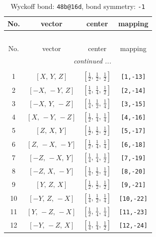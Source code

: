 \documentclass[fleqn,8pt]{jsarticle}
\begin{document}
\begin{longtable}{cccc}
\caption{Wyckoff bond: {\tt 48b@16d}, bond symmetry: {\tt -1}}
 \\
 \hline \hline
No. & vector & center & mapping \\ \hline \endfirsthead

\multicolumn{3}{l}{\tablename\ \thetable{}} \\
 \hline \hline
No. & vector & center & mapping \\ \hline \endhead

 \hline \hline
\multicolumn{3}{r}{\footnotesize\it continued ...} \\ \endfoot

 \hline \hline
\multicolumn{3}{r}{} \\ \endlastfoot

1 & $\left[ X,\, Y,\, Z \right]$ & $\left[ \frac{1}{2},\, \frac{1}{2},\, \frac{1}{2} \right]$ & {\tt [1,-13]} \\ \hline
2 & $\left[ - X,\, - Y,\, Z \right]$ & $\left[ \frac{1}{4},\, \frac{1}{4},\, \frac{1}{2} \right]$ & {\tt [2,-14]} \\ \hline
3 & $\left[ - X,\, Y,\, - Z \right]$ & $\left[ \frac{1}{4},\, \frac{1}{2},\, \frac{1}{4} \right]$ & {\tt [3,-15]} \\ \hline
4 & $\left[ X,\, - Y,\, - Z \right]$ & $\left[ \frac{1}{2},\, \frac{1}{4},\, \frac{1}{4} \right]$ & {\tt [4,-16]} \\ \hline
5 & $\left[ Z,\, X,\, Y \right]$ & $\left[ \frac{1}{2},\, \frac{1}{2},\, \frac{1}{2} \right]$ & {\tt [5,-17]} \\ \hline
6 & $\left[ Z,\, - X,\, - Y \right]$ & $\left[ \frac{1}{2},\, \frac{1}{4},\, \frac{1}{4} \right]$ & {\tt [6,-18]} \\ \hline
7 & $\left[ - Z,\, - X,\, Y \right]$ & $\left[ \frac{1}{4},\, \frac{1}{4},\, \frac{1}{2} \right]$ & {\tt [7,-19]} \\ \hline
8 & $\left[ - Z,\, X,\, - Y \right]$ & $\left[ \frac{1}{4},\, \frac{1}{2},\, \frac{1}{4} \right]$ & {\tt [8,-20]} \\ \hline
9 & $\left[ Y,\, Z,\, X \right]$ & $\left[ \frac{1}{2},\, \frac{1}{2},\, \frac{1}{2} \right]$ & {\tt [9,-21]} \\ \hline
10 & $\left[ - Y,\, Z,\, - X \right]$ & $\left[ \frac{1}{4},\, \frac{1}{2},\, \frac{1}{4} \right]$ & {\tt [10,-22]} \\ \hline
11 & $\left[ Y,\, - Z,\, - X \right]$ & $\left[ \frac{1}{2},\, \frac{1}{4},\, \frac{1}{4} \right]$ & {\tt [11,-23]} \\ \hline
12 & $\left[ - Y,\, - Z,\, X \right]$ & $\left[ \frac{1}{4},\, \frac{1}{4},\, \frac{1}{2} \right]$ & {\tt [12,-24]} \\
\end{longtable}
\end{document}
